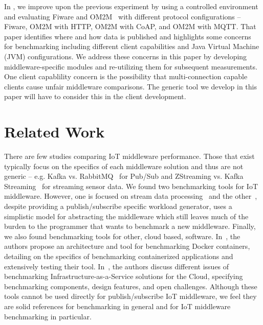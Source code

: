 \documentclass[conference]{IEEEtran}
\begin{document}
In \cite{pereira_benchmarking_2018}, we improve upon the previous experiment by using a controlled environment %
and evaluating Fiware and OM2M~\cite{oneM2MHo30:online} with different protocol configurations -- Fiware, OM2M with HTTP, OM2M with CoAP, and OM2M with MQTT. That paper identifies where and how data is published and highlights some concerns for benchmarking including different client capabilities and Java Virtual Machine (JVM) configurations. %
We address these concerns in this paper by developing middleware-specific modules and re-utilizing them for subsequent measurements. One client capablility concern is the possibility that multi-connection capable clients cause unfair middleware comparisons. The generic tool we develop in this paper will have to consider this in the client development. %

\section{Related Work}

There are few studies comparing IoT middleware performance. Those that exist typically focus on the specifics of each middleware solution and thus are not generic -- e.g. Kafka vs. RabbitMQ~\cite{dobbelaere_kafka_2017} for Pub/Sub and ZStreaming vs. Kafka Streaming~\cite{fernandez-rodraguez_benchmarking_2017} for streaming sensor data. We found two benchmarking tools for IoT middleware. However, one is focused on stream data processing~\cite{shukla_riotbench:_2017} and the other~\cite{zhang_psbench:_2014}, despite providing a publish/subscribe specific workload generator, uses a simplistic model for abstracting the middleware which still leaves much of the burden to the programmer that wants to benchmark a new middleware. Finally, we also found benchmarking tools for other, cloud based, software. In~\cite{varghese_doclite:_2016}, the authors propose an architecture and tool for benchmarking Docker containers, detailing on the specifics of benchmarking containerized applications and extensively testing their tool. In~\cite{iosup_iaas_2014}, the authors discuss different issues of benchmarking Infrastructure-as-a-Service solutions for the Cloud, specifying benchmarking components, design features, and open challenges. Although these tools cannot be used directly for publish/subscribe IoT middleware, we feel they are solid references for benchmarking in general and for IoT middleware benchmarking in particular.
\end{document}
